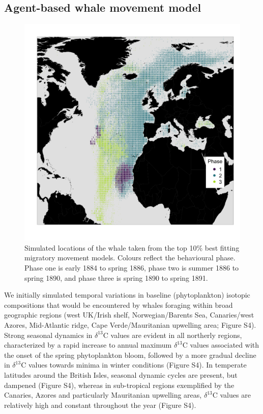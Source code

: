 \documentclass[a4paper,12pt]{article}
\begin{document}
\subsection{Agent-based whale movement model}

\begin{figure}
 \centering
 \includegraphics[width = \linewidth]{figures/Figure-2-points.png}
  \caption{Simulated locations of the whale taken from the top 10\% best fitting migratory movement models. 
  Colours reflect the behavioural phase. 
  Phase one is early 1884 to spring 1886, phase two is summer 1886 to spring 1890, and phase three is spring 1890 to spring 1891.}
  \label{fig2}
\end{figure}

We initially simulated temporal variations in baseline (phytoplankton) isotopic compositions that would be encountered by whales foraging within broad geographic regions (west UK/Irish shelf, Norwegian/Barents Sea, Canaries/west Azores, Mid-Atlantic ridge, Cape Verde/Mauritanian upwelling area; Figure S4). 
Strong seasonal dynamics in $\delta^{13}$C values are evident in all northerly regions, characterized by a rapid increase to annual maximum $\delta^{13}$C values associated with the onset of the spring phytoplankton bloom, followed by a more gradual decline in $\delta^{13}$C values towards minima in winter conditions (Figure S4). 
In temperate latitudes around the British Isles, seasonal dynamic cycles are present, but dampened (Figure S4), whereas in sub-tropical regions exemplified by the Canaries, Azores and particularly Mauritanian upwelling areas, $\delta^{13}$C values are relatively high and constant throughout the year (Figure S4).
\end{document}
